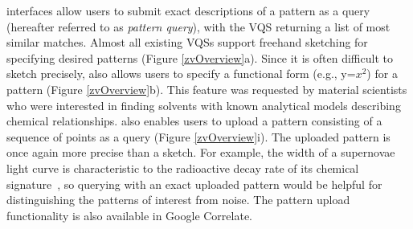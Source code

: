 interfaces 
allow users to submit exact descriptions 
of a pattern as a query 
(hereafter referred to as \textit{pattern query}), 
with the VQS returning a list of most similar matches. 
Almost all existing VQSs support freehand 
sketching for specifying desired patterns 
(Figure \ref{zvOverview}a). 
Since it is often difficult to sketch precisely, 
\zvpp also allows users to specify a functional 
form (e.g., y=$x^2$) for a pattern (Figure \ref{zvOverview}b). 
This feature was requested by material scientists 
who were interested in finding solvents 
with known analytical models describing chemical relationships. 
\zvpp also enables users to upload a pattern consisting of a sequence of points as a query (Figure \ref{zvOverview}i). 
The uploaded pattern is once again more precise than a sketch. 
For example, the width of a supernovae light curve 
is characteristic to the radioactive decay rate of its chemical signature~\cite{Nugent1997}, so querying with an exact uploaded pattern would be helpful for distinguishing the patterns of interest from noise. 
The pattern upload functionality is also available in Google Correlate.

